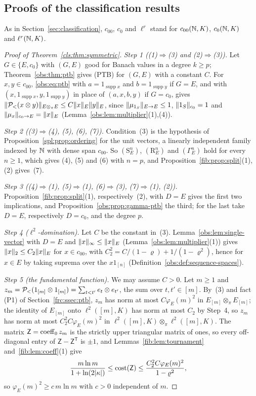 \subsection{Proofs of the classification results}\label{frc:ssec:classification}
As in Section~\ref{sec:classification}, $c_{00}$, $c_0$ and $\ell^r$ stand for $c_{00}(\mathbb N,K)$, $c_0(\mathbb N,K)$ and
$\ell^r(\mathbb N,K)$.

\begin{proof}[Proof of Theorem~\ref{cls:thm:symmetric}]
\emph{Step 1 ((1)$\Rightarrow$(3) and (2)$\Rightarrow$(3)).} Let $G\in\{E,c_0\}$ with $(G,E)$ good for Banach values in
a degree $k\ge p$; Theorem~\ref{obs:thm:ptb} gives \textup{(PTB)} for $(G,E)$ with a constant $C$. For $x,y\in c_{00}$,
\eqref{obs:eq:ptb} with $a=1_{\operatorname{supp}x}$ and $b=1_{\operatorname{supp}y}$ if $G=E$, and with
$(x,1_{\operatorname{supp}x},y,1_{\operatorname{supp}y})$ in place of $(a,x,b,y)$ if $G=c_0$, gives
$\lVert \mathcal P_<(x\otimes y)\rVert_{E\otimes_\pi E}\le C\lVert x\rVert_E\lVert y\rVert_E$, since $\lVert \mu_{1_S}\rVert_{E\to E}\le1$, $\lVert 1_S\rVert_{c_0}=1$
and $\lVert \mu_x\rVert_{c_0\to E}=\lVert x\rVert_E$ (Lemma~\ref{obs:lem:multiplier}(1),(4)).

\emph{Step 2 ((3)$\Rightarrow$(4), (5), (6), (7)).} Condition~(3) is the hypothesis of
Proposition~\ref{spl:prop:ordering} for the unit vectors, a linearly independent family indexed by $\mathbb N$ with dense span
$c_{00}$. So $(\mathrm S^n_E)$, $(\mathrm R^n_E)$ and $(\Gamma^n_E)$ hold for every $n\ge1$, which gives (4), (5) and (6) with
$n=p$, and Proposition~\ref{fib:prop:split}(1),(2) gives~(7).

\emph{Step 3 ((4)$\Rightarrow$(1), (5)$\Rightarrow$(1), (6)$\Rightarrow$(3), (7)$\Rightarrow$(1), (2)).}
Proposition~\ref{fib:prop:split}(1), respectively~(2), with $D=E$ gives the first two implications, and
Proposition~\ref{obs:prop:gamma-ptb} the third; for the last take $D=E$, respectively $D=c_0$, and the degree $p$.

\emph{Step 4 ($\ell^2$-domination).} Let $C$ be the constant in~(3). Lemma~\ref{obs:lem:single-vector} with $D=E$ and
$\lVert x\rVert_\infty\le\lVert x\rVert_E$ (Lemma~\ref{obs:lem:multiplier}(1)) gives $\lVert x\rVert_2\le C_2\lVert x\rVert_E$ for $x\in c_{00}$, with
$C_2^2=C/(1-\varrho)+1/(1-\varrho^2)$, hence for $x\in E$ by taking suprema over the $x1_{[n]}$
(Definition~\ref{obs:def:sequence-spaces}).

\emph{Step 5 (the fundamental function).} We may assume $C>0$. Let $m\ge1$ and
$z_m=\mathcal P_<(1_{[m]}\otimes1_{[m]})=\sum_{t<t'}e_t\otimes e_{t'}$, the sum over $t,t'\in[m]$. By~(3) and fact (P1) of
Section~\ref{frc:ssec:ptb}, $z_m$ has norm at most $C\varphi_E(m)^2$ in $E_{[m]}\otimes_\pi E_{[m]}$; the identity of
$E_{[m]}$ onto $\ell^2([m],K)$ has norm at most $C_2$ by Step~4, so $z_m$ has norm at most $C_2^2C\varphi_E(m)^2$ in
$\ell^2([m],K)\otimes_\pi\ell^2([m],K)$. The matrix $\mathsf Z=\operatorname{coeff}_0z_m$ is the strictly upper triangular matrix of
ones, so every off-diagonal entry of $\mathsf Z-\mathsf Z^{\mathsf T}$ is $\pm1$, and Lemmas~\ref{fib:lem:tournament}
and~\ref{fib:lem:coeff}(1) give
\[
 \frac{m\ln m}{1+\ln(2\lvert \kappa\rvert)}\le\operatorname{cost}(\mathsf Z)\le\frac{C_2^2C\varphi_E(m)^2}{1-\varrho^2},
\]
so $\varphi_E(m)^2\ge c\,m\ln m$ with $c>0$ independent of $m$.
\end{proof}

